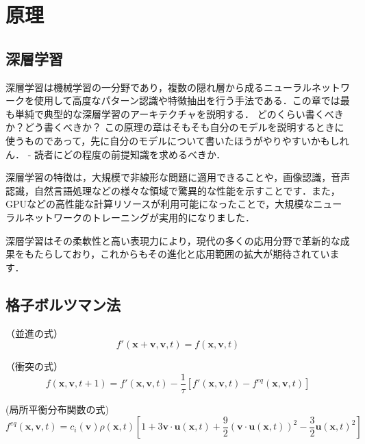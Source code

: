 \chapter{原理 \label{chap:principles}}
\section{深層学習 \label{section:deep-learning}}
深層学習は機械学習の一分野であり，複数の隠れ層から成るニューラルネットワークを使用して高度なパターン認識や特徴抽出を行う手法である．この章では最も単純で典型的な深層学習のアーキテクチャを説明する．
どのくらい書くべきか？どう書くべきか？
この原理の章はそもそも自分のモデルを説明するときに使うものであって，先に自分のモデルについて書いたほうがやりやすいかもしれん．
- 読者にどの程度の前提知識を求めるべきか．
\fi

深層学習の特徴は，大規模で非線形な問題に適用できることや，画像認識，音声認識，自然言語処理などの様々な領域で驚異的な性能を示すことです．また，GPUなどの高性能な計算リソースが利用可能になったことで，大規模なニューラルネットワークのトレーニングが実用的になりました．

深層学習はその柔軟性と高い表現力により，現代の多くの応用分野で革新的な成果をもたらしており，これからもその進化と応用範囲の拡大が期待されています．

\section{格子ボルツマン法 \label{section:lbm}}

（並進の式）
\begin{equation}
  f'(\bm{x}+\bm{v}, \bm{v}, t)
  = f(\bm{x}, \bm{v}, t)
  \label{eq:principles-streaming}
\end{equation}

（衝突の式）
\begin{equation}
  f(\bm{x}, \bm{v}, t+1) = 
  f'(\bm{x}, \bm{v}, t) - 
  \frac{1}{\tau} \left[ 
    f'(\bm{x}, \bm{v}, t) - f^{eq}(\bm{x}, \bm{v}, t) 
  \right]
  \label{eq:principles-collision}
\end{equation}

(局所平衡分布関数の式)
\begin{equation}
  f^{eq}(\bm{x}, \bm{v}, t) = 
  c_i(\bm{v}) \rho(\bm{x}, t) \left[ 
    1 
    + 3\bm{v} \cdot \bm{u}(\bm{x}, t) 
    + \frac{9}{2}(\bm{v} \cdot \bm{u}(\bm{x}, t))^2 
    - \frac{3}{2}\bm{u}(\bm{x}, t)^2 
  \right]
  \label{eq:principles-equilibrium}
\end{equation}
